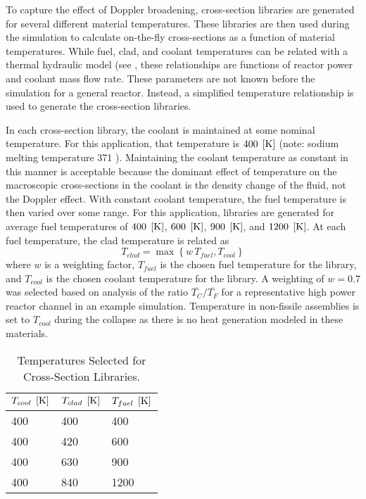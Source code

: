     To capture the effect of Doppler broadening, cross-section libraries are
    generated for several different material temperatures. These libraries are
    then used during the simulation to calculate on-the-fly cross-sections as a
    function of material temperatures.
    While fuel, clad, and coolant temperatures can be related with a thermal
    hydraulic model (see , these relationships are 
    functions of reactor power and coolant mass flow rate. These parameters are
    not known before the simulation for a general reactor. Instead, a simplified
    temperature relationship is used to generate the cross-section libraries.

    In each cross-section library, the coolant is maintained at some nominal
    temperature. For this application, that temperature is $400 \;\left[\text{{K}}\right]$
    (note: sodium melting temperature 371 ). Maintaining the coolant
    temperature as constant in this manner is acceptable because the dominant 
    effect of temperature on the macroscopic cross-sections in the coolant is 
    the density change of the fluid, not the Doppler effect. With constant 
    coolant temperature, the fuel temperature is then varied over some range. 
    For this application, libraries are generated for average fuel temperatures
    of $400 \;\left[\text{{K}}\right]$, $600 \;\left[\text{{K}}\right]$, $900 \;\left[\text{{K}}\right]$, and $1200 \;\left[\text{{K}}\right]$.
    At each fuel temperature, the clad temperature is related as 
    \begin{equation}
      T_{clad} = \max \left\{ w \, T_{fuel}, T_{cool} \right\}
    \end{equation}
    where $w$ is a weighting factor, $T_{fuel}$ is the chosen fuel temperature
    for the library, and $T_{cool}$ is the chosen coolant temperature for the
    library. A weighting of $w=0.7$ was selected based on analysis of the ratio
    $\overline{T_C}/\overline{T_F}$ for a representative high power reactor
    channel in an example simulation. Temperature in non-fissile assemblies is 
    set to $T_{cool}$ during the collapse as there is no heat generation modeled
    in these materials.

    \begin{table}
      \caption{Temperatures Selected for Cross-Section Libraries.}
      \label{tab:xstemps}
      \begin{center}
        \begin{tabular}{lll}
          \toprule
          $T_{cool} \;\left[\text{{K}}\right]$ & $T_{clad} \;\left[\text{{K}}\right]$ & $T_{fuel} \;\left[\text{{K}}\right]$ \\
          \midrule
          400 & 400 & 400  \\
          400 & 420 & 600  \\
          400 & 630 & 900  \\
          400 & 840 & 1200 \\
          \bottomrule
        \end{tabular}
      \end{center}
    \end{table}

